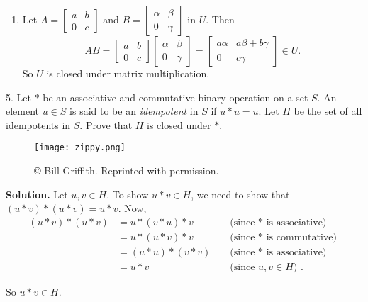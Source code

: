 \documentclass[10pt,]{book}
\theoremstyle{plain}
\theoremstyle{definition}
\theoremstyle{definition}
\theoremstyle{definition}
\theoremstyle{definition}
\numberwithin{equation}{section}
\newcommand{\amp}{&}
\begin{document}
\begin{exerciselist}
\begin{enumerate}[label=(\alph*)]
\item\hypertarget{li-73}{}Let \(A=\begin{bmatrix}a \amp b \\ 0 \amp c\end{bmatrix}\) and \(B=\begin{bmatrix}\alpha \amp \beta \\ 0 \amp \gamma\end{bmatrix}\) in \(U\). Then%
\begin{equation*}
AB=
\begin{bmatrix}
a \amp  b \\
0 \amp  c
\end{bmatrix} 
\begin{bmatrix}
\alpha \amp  \beta \\
0 \amp  \gamma
\end{bmatrix} 
=
\begin{bmatrix}
a\alpha \amp  a\beta+b\gamma \\
0 \amp  c\gamma
\end{bmatrix} 
\in U.
\end{equation*}
So \(U\) is closed under matrix multiplication.%
\end{enumerate}
%
\item[5.]\hypertarget{exercise-11}{}Let \(*\) be an associative and commutative binary operation on a set \(S\). An element \(u\in S\) is said to be an \emph{idempotent} in \(S\) if \(u*u=u\). Let \(H\) be the set of all idempotents in \(S\). Prove that \(H\) is closed under \(*\).%
\begin{figure}
\centering
\texttt{[image: zippy.png]}
\caption{©  Bill Griffith. Reprinted with permission.\label{zip}}
\end{figure}
\par\smallskip
\par\smallskip
\noindent\textbf{Solution.}\hypertarget{solution-11}{}\quad
Let \(u,v\in H\). To show \(u*v\in H\), we need to show that \((u*v)*(u*v)=u*v\). Now,%
\begin{align*}
(u*v)*(u*v)\amp =u*(v*u)*v \amp \amp \text{ (since \(*\) is associative) }\\
\amp =u*(u*v)*v \amp \amp \text{ (since \(*\) is commutative) }\\
\amp =(u*u)*(v*v) \amp \amp \text{ (since \(*\) is associative) }\\
\amp =u*v \amp \amp \text{ (since \(u,v\in H\)) } .
\end{align*}
%
\par
So \(u*v\in H\).%
\end{exerciselist}
\typeout{************************************************}
\typeout{************************************************}
\end{document}
